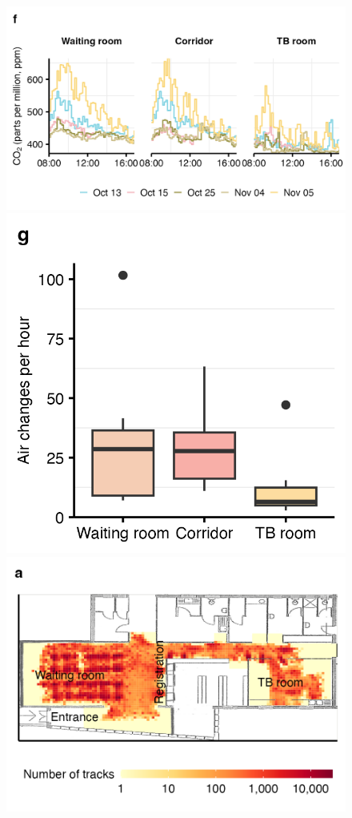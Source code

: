 \documentclass[fleqn,11pt]{wlscirep}
\begin{document}
\begin{figure}
    \centering
    \includegraphics{results/data/co2-levels-over-time.png}
    \includegraphics{results/data/air-changes-per-hour.png}
     \includegraphics{results/data/no-people-spatial.png}

\end{figure}
\end{document}
